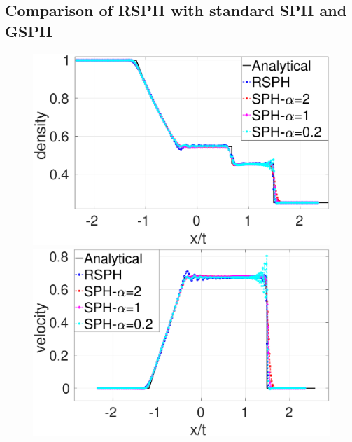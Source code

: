 \subsection{Comparison of RSPH with standard SPH and GSPH}
\begin{figure}
    \centering
    \begin{minipage}{.495\textwidth}
        \centering
        \includegraphics[width=0.99 \textwidth]{Chapter-4/Figures/Sod/RCM-Sod-SPH-alf-rho}
    \end{minipage}%
    \begin{minipage}{.495 \textwidth}
        \centering
        \includegraphics[width=0.99 \textwidth]{Chapter-4/Figures/Sod/RCM-Sod-SPH-alf-v}
    \end{minipage}%
    \\
    \begin{minipage}{.495\textwidth}
        \centering

\end{minipage}
\end{figure}
